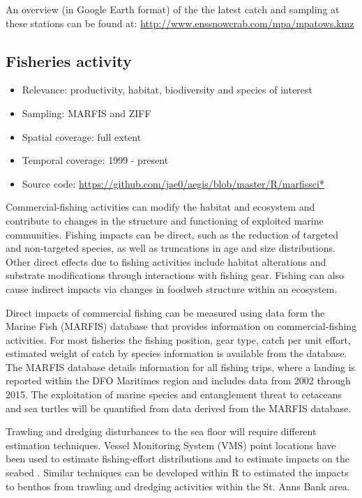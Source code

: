 \documentclass[letterpaper,portrait,11pt]{scrartcl}
\numberwithin{equation}{section}    %
\numberwithin{figure}{section}    %
\numberwithin{table}{section}       %
\begin{document}
An overview (in Google Earth format) of the the latest catch and sampling at these stations can be found at: \url{http://www.enssnowcrab.com/mpa/mpatows.kmz}


\subsection{Fisheries activity}

\begin{itemize}
	\item Relevance:  productivity, habitat, biodiversity and species of interest
	\item Sampling:  MARFIS and ZIFF
	\item Spatial coverage: full extent
	\item Temporal coverage: 1999 - present
	\item Source code: \url{https://github.com/jae0/aegis/blob/master/R/marfissci*}
\end{itemize}


Commercial-fishing activities can modify the habitat and ecosystem and contribute to changes in the structure and functioning of exploited marine communities.  Fishing impacts can be direct, such as the reduction of targeted and non-targeted species, as well as truncations in age and size distributions.  Other direct effects due to fishing activities include habitat alterations and substrate modifications through interactions with fishing gear. Fishing can also cause indirect impacts via changes in foodweb structure within an ecosystem.

Direct impacts of commercial fishing can be measured using data form the Marine Fish (MARFIS) database that provides information on commercial-fishing activities.  For most fisheries the fishing position, gear type, catch per unit effort, estimated weight of catch by species information is available from the database. The MARFIS database details information for all fishing trips, where a landing is reported within the DFO Maritimes region and includes data from 2002 through 2015. The exploitation of marine species and entanglement threat to cetaceans and sea turtles will be quantified from data derived from the MARFIS database.

Trawling and dredging disturbances to the sea floor will require different estimation techniques.  Vessel Monitoring System (VMS) point locations have been used to estimate fishing-effort distributions \parencites[e.g., ][]{lee2010developing} and to estimate impacts on the seabed \parencite{gerritsen2013much}.  Similar techniques can be developed within R to estimated the impacts to benthos from trawling and dredging activities within the St. Anns Bank area.
\end{document}
